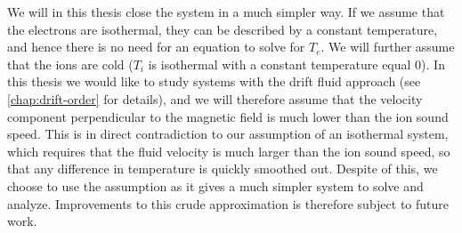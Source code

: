 We will in this thesis close the system in a much simpler way.
If we assume that the electrons are isothermal, they can be described by a constant temperature, and hence there is no need for an equation to solve for $T_e$.
We will further assume that the ions are cold ($T_i$ is isothermal with a constant temperature equal $0$).
In this thesis we would like to study systems with the drift fluid approach (see \cref{chap:drift-order} for details), and we will therefore assume that the velocity component perpendicular to the magnetic field is much lower than the ion sound speed.
This is in direct contradiction to our assumption of an isothermal system, which requires that the fluid velocity is much larger than the ion sound speed, so that any difference in temperature is quickly smoothed out.
Despite of this, we choose to use the assumption as it gives a much simpler system to solve and analyze.
Improvements to this crude approximation is therefore subject to future work.
